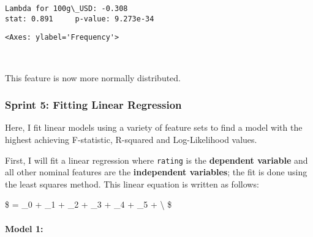 \documentclass[11pt]{article}
\makeatletter
\newcommand{\boxspacing}{\kern\kvtcb@left@rule\kern\kvtcb@boxsep}
\newcommand{\prompt}[4]{
        {\ttfamily\llap{{\color{#2}[#3]:\hspace{3pt}#4}}\vspace{-\baselineskip}}
    }
\makeatother
\begin{document}
    \begin{Verbatim}[commandchars=\\\{\}]
Lambda for 100g\_USD: -0.308
stat: 0.891     p-value: 9.273e-34
    \end{Verbatim}

            \begin{tcolorbox}[breakable, size=fbox, boxrule=.5pt, pad at break*=1mm, opacityfill=0]
\prompt{Out}{outcolor}{13}{\boxspacing}
\begin{Verbatim}[commandchars=\\\{\}]
<Axes: ylabel='Frequency'>
\end{Verbatim}
\end{tcolorbox}
        
    \begin{center}
    \end{center}
    { \hspace*{\fill} \\}
    
    This feature is now more normally distributed.

    \subsubsection{Sprint 5: Fitting Linear
Regression}\label{sprint-5-fitting-linear-regression}

Here, I fit linear models using a variety of feature sets to find a
model with the highest achieving F-statistic, R-squared and
Log-Likelihood values.

First, I will fit a linear regression where \texttt{rating} is the
\textbf{dependent variable} and all other nominal features are the
\textbf{independent variables}; the fit is done using the least squares
method. This linear equation is written as follows:

\$  = \beta\_0 + \beta\_1  + \beta\_2 
+ \beta\_3  + \beta\_4  + \beta\_5
 + \epsilon \textbackslash{} \$

\paragraph{Model 1:}\label{model-1}
\end{document}
